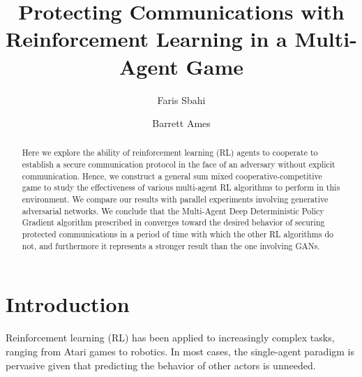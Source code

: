 \documentclass{llncs}
\begin{document}
\title{Protecting Communications with Reinforcement Learning in a Multi-Agent Game}
%
%
\author{Faris Sbahi \and Barrett Ames}
%
%
%

\maketitle              %

\begin{abstract}
Here we explore the ability of reinforcement learning (RL) agents to cooperate to establish a secure communication protocol in the face of an adversary without explicit communication. Hence, we construct a general sum mixed cooperative-competitive game to study the effectiveness of various multi-agent RL algorithms to perform in this environment. We compare our results with parallel experiments involving generative adversarial networks. We conclude that the Multi-Agent Deep Deterministic Policy Gradient algorithm prescribed in \cite{lowe2017multi} converges toward the desired behavior of securing protected communications in a period of time with which the other RL algorithms do not, and furthermore it represents a stronger result than the one involving GANs.
\end{abstract}
%
\section{Introduction}
%
%
%
%
%
%
%
%
%
Reinforcement learning (RL) has been applied to increasingly complex tasks, ranging from Atari games to robotics. In most cases, the single-agent paradigm is pervasive given that predicting the behavior of other actors is unneeded.
\end{document}
